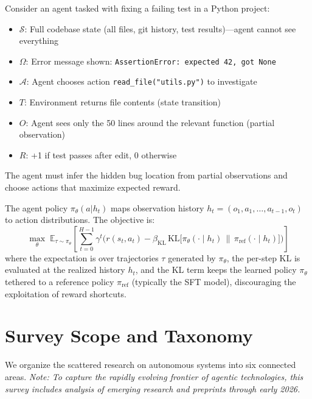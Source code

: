 \documentclass[12pt,a4paper]{report}
\theoremstyle{definition}
\begin{document}
\begin{tcolorbox}[colback=gray!5!white, colframe=gray!60!black, title=\textbf{Concrete Example: Bug-Fixing Agent as POMDP}]
\small
Consider an agent tasked with fixing a failing test in a Python project:
\begin{itemize}
    \item $\mathcal{S}$: Full codebase state (all files, git history, test results)---agent cannot see everything
    \item $\Omega$: Error message shown: \texttt{AssertionError: expected 42, got None}
    \item $\mathcal{A}$: Agent chooses action \texttt{read\_file("utils.py")} to investigate
    \item $T$: Environment returns file contents (state transition)
    \item $O$: Agent sees only the 50 lines around the relevant function (partial observation)
    \item $R$: +1 if test passes after edit, 0 otherwise
\end{itemize}
The agent must infer the hidden bug location from partial observations and choose actions that maximize expected reward.
\end{tcolorbox}

The agent policy $\pi_\theta(a|h_t)$ maps observation history $h_t = (o_1, a_1, \ldots, a_{t-1}, o_t)$ to action distributions. The objective is:
\begin{equation}
\max_\theta \; \mathbb{E}_{\tau \sim \pi_\theta} \left[ \sum_{t=0}^{H-1} \gamma^t \Big( r(s_t, a_t) - \beta_{\text{KL}}\, \text{KL}\big[\pi_\theta(\cdot \mid h_t) \,\|\, \pi_{\text{ref}}(\cdot \mid h_t)\big] \Big) \right]
\label{eq:objective}
\end{equation}
where the expectation is over trajectories $\tau$ generated by $\pi_\theta$, the per-step KL is evaluated at the realized history $h_t$, and the KL term keeps the learned policy $\pi_\theta$ tethered to a reference policy $\pi_{\text{ref}}$ (typically the SFT model), discouraging the exploitation of reward shortcuts.

\section{Survey Scope and Taxonomy}
We organize the scattered research on autonomous systems into six connected areas. \textit{Note: To capture the rapidly evolving frontier of agentic technologies, this survey includes analysis of emerging research and preprints through early 2026.}
\end{document}

